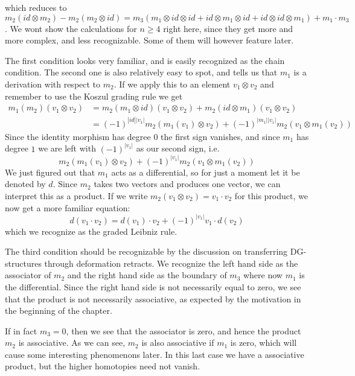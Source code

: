 which reduces to $m_2(id\otimes m_2) - m_2(m_2\otimes id) = m_3(m_1\otimes id \otimes id + id\otimes m_1 \otimes id + id\otimes id \otimes m_1) + m_1\cdot m_3 $. We wont show the calculations for $n \geq 4$ right here, since they get more and more complex, and less recognizable. Some of them will however feature later.   

The first condition looks very familiar, and is easily recognized as the chain condition. The second one is also relatively easy to spot, and tells us that $m_1$ is a derivation with respect to $m_2$. If we apply this to an element $v_1\otimes v_2$ and remember to use the Koszul grading rule we get 
\begin{align*}
    m_1(m_2)(v_1 \otimes v_2) 
    &= m_2(m_1\otimes id)(v_1\otimes v_2) + m_2(id\otimes m_1)(v_1\otimes v_2) \\
    &= (-1)^{|id||v_1|}m_2(m_1(v_1)\otimes v_2) + (-1)^{|m_1||v_1|}m_2(v_1\otimes m_1(v_2))
\end{align*}
Since the identity morphism has degree $0$ the first sign vanishes, and since $m_1$ has degree $1$ we are left with $(-1)^{|v_1|}$ as our second sign, i.e.
\begin{equation*}
    m_2(m_1(v_1)\otimes v_2) + (-1)^{|v_1|}m_2(v_1\otimes m_1(v_2))
\end{equation*}
We just figured out that $m_1$ acts as a differential, so for just a moment let it be denoted by $d$. Since $m_2$ takes two vectors and produces one vector, we can interpret this as a product. If we write $m_2(v_1\otimes v_2)=v_1\cdot v_2$ for this product, we now get a more familiar equation:
\begin{equation*}
    d(v_1\cdot v_2) = d(v_1)\cdot v_2 + (-1)^{|v_1|}v_1\cdot d(v_2)
\end{equation*}
which we recognize as the graded Leibniz rule. 

The third condition should be recognizable by the discussion on transferring DG-structures through deformation retracts. We recognize the left hand side as the associator of $m_2$ and the right hand side as the boundary of $m_3$ where now $m_1$ is the differential. Since the right hand side is not necessarily equal to zero, we see that the product is not necessarily associative, as expected by the motivation in the beginning of the chapter. 

If in fact $m_3 = 0$, then we see that the associator is zero, and hence the product $m_2$ is associative.  As we can see, $m_2$ is also associative if $m_1$ is zero, which will cause some interesting phenomenons later. In this last case we have a associative product, but the higher homotopies need not vanish. 


